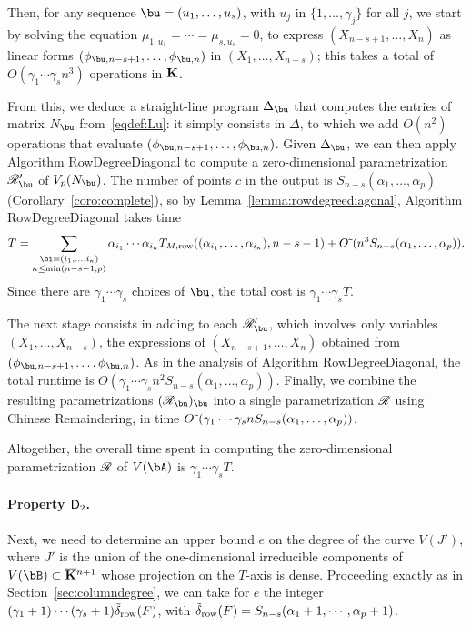 \documentclass[12pt]{article}
\begin{document}
Then, for any sequence $\bu=(u_1,\dots,u_s)$, with $u_j$ in
$\{1,\dots,\gamma_j\}$ for all $j$, we start by solving the equation
$\mu_{1,u_1} = \cdots = \mu_{s,u_s}=0$, to express
$(X_{n-s+1},\dots,X_n)$ as linear forms
$(\phi_{\bu,n-s+1},\dots,\phi_{\bu,n})$ in $(X_1,\dots,X_{n-s})$; this
takes a total of $O(\gamma_1 \cdots \gamma_s n^3)$ operations in $\mathbf{K}$.

From this, we deduce a straight-line program $\Delta_\bu$ that
computes the entries of matrix $\mN_\bu$ from~\eqref{eqdef:Lu}: it
simply consists in $\Delta$, to which we add $O(n^2)$ operations that
evaluate $(\phi_{\bu,n-s+1},\dots,\phi_{\bu,n})$. Given $\Delta_\bu$, we 
can then apply Algorithm {\sf RowDegreeDiagonal} to compute 
a zero-dimensional parametrization $\scrR'_\bu$ of $V_p(\mN_\bu)$.
The number of points $c$ in the output is $S_{n-s}(\alpha_1,\dots,\alpha_p)$
(Corollary~\ref{coro:complete}),
so by Lemma~\ref{lemma:rowdegreediagonal}, Algorithm {\sf RowDegreeDiagonal} takes time 
\begin{eqnarray}
T=\sum_{\substack{\bi=(i_1,\dots,i_\kappa)\\ \kappa\le\min(n-s-1,p)}}
\alpha_{i_1} \cdots \alpha_{i_\kappa} T_{M,{\rm row}}((\alpha_{i_1},\dots,\alpha_{i_\kappa}), n-s-1)
+
\softO(n^3 S_{n-s}(\alpha_1,\dots,\alpha_p)).  \label{eqdef:T}
\end{eqnarray}
Since there are  $\gamma_1 \cdots \gamma_s$ choices of $\bu$,
the total cost is  $\gamma_1 \cdots \gamma_s T$.

The next stage consists in adding to each $\scrR'_\bu$, which involves
only variables $(X_1,\dots,X_{n-s})$, the expressions of
$(X_{n-s+1},\dots,X_n)$ obtained from
$(\phi_{\bu,n-s+1},\dots,\phi_{\bu,n})$. As in the analysis of
Algorithm {\sf RowDegreeDiagonal}, the total runtime is $O(\gamma_1
\cdots \gamma_s n^2 S_{n-s}(\alpha_1,\dots,\alpha_p))$. Finally, we
combine the resulting parametrizations $(\scrR_\bu)_\bu$ into a single
parametrization $\mathscr{R}$ using Chinese Remaindering, in time
${O}{\,\tilde{ }\,}(\gamma_1 \cdots \gamma_s n S_{n-s}(\alpha_1,\dots,\alpha_p))$.

Altogether, the overall time spent in computing the zero-dimensional
parametrization $\mathscr{R}$ of $V(\bA)$ is 
  $\gamma_1 \cdots \gamma_s T$.


\paragraph{Property $\mathsf{D}_2$.} Next, we need to determine an upper bound 
$e$ on the degree of the curve $V(J')$, where $J'$ is the union of the
one-dimensional irreducible components of $V(\bB) \subset
\KKbar{}^{n+1}$ whose projection on the $T$-axis is dense. Proceeding
exactly as in Section~\ref{sec:columndegree}, we can take for $e$ the
integer $(\gamma_1+1)\cdots(\gamma_s+1) \tilde\delta_{\rm row}({F})$,
with $\tilde\delta_{\rm row}({F})=S_{n-s}(\alpha_1 +1,\cdots,\alpha_p+1)$.
\end{document}
